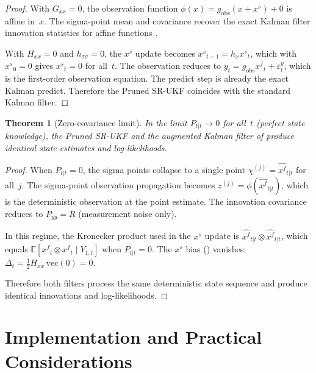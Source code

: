 \documentclass[12pt,a4paper]{article}
\newtheorem{theorem}{Theorem}[section]
\newcommand{\E}{\mathbb{E}}
\newcommand{\vect}{\mathrm{vec}}
\newcommand{\kron}{\otimes}
\newcommand{\xf}{{x^{f}}}
\newcommand{\xs}{{x^{s}}}
\newcommand{\hx}{h_x}
\newcommand{\Gxx}{G_{xx}}
\newcommand{\Hxx}{H_{xx}}
\newcommand{\hsig}{{h_{\sigma\sigma}}}
\begin{document}
\begin{proof}
With $\Gxx = 0$, the observation function $\phi(x) = g_{\mathrm{obs}}(x + \xs) + 0$
is affine in~$x$. The sigma-point mean and covariance recover the
exact Kalman filter innovation statistics for affine functions
\citep{wan2000unscented}.

With $\Hxx = 0$ and $\hsig = 0$, the $\xs$ update becomes
$\xs_{t+1} = \hx \xs_t$, which with $\xs_0 = 0$ gives
$\xs_t = 0$ for all~$t$. The observation reduces to
$y_t = g_{\mathrm{obs}} \xf_t + \varepsilon_t^y$, which is the
first-order observation equation. The predict step is already the
exact Kalman predict. Therefore the Pruned SR-UKF coincides with
the standard Kalman filter.
\end{proof}

\begin{theorem}[Zero-covariance limit]\label{thm:zero-cov}
In the limit $P_{t|t} \to 0$ for all~$t$ (perfect state
knowledge), the Pruned SR-UKF and the augmented Kalman filter
of  produce identical state estimates and
log-likelihoods.
\end{theorem}

\begin{proof}
When $P_{t|t} = 0$, the sigma points collapse to a single point
$\chi^{(j)} = \hat{\xf}_{t|t}$ for all~$j$. The sigma-point
observation propagation becomes
$z^{(j)} = \phi(\hat{\xf}_{t|t})$, which is the deterministic
observation at the point estimate. The innovation covariance reduces
to $P_{yy} = R$ (measurement noise only).

In this regime, the Kronecker product used in the $\xs$ update is
$\hat{\xf}_{t|t} \kron \hat{\xf}_{t|t}$, which equals
$\E[\xf_t \kron \xf_t \mid Y_{1:t}]$ when $P_{t|t} = 0$. The
$\xs$ bias () vanishes:
$\Delta_t = \tfrac{1}{2}\Hxx\,\vect(0) = 0$.

Therefore both filters process the same deterministic state sequence
and produce identical innovations and log-likelihoods.
\end{proof}


\section{Implementation and Practical Considerations}\label{sec:implementation}
\end{document}

